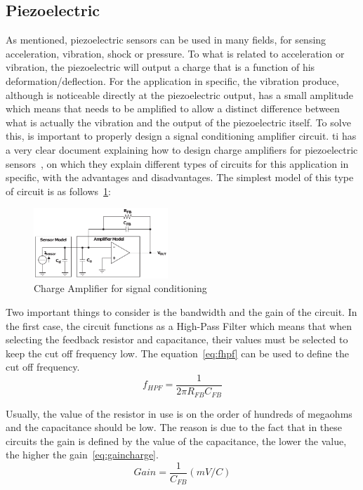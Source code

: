 \subsection{Piezoelectric}
As mentioned, piezoelectric sensors can be used in many fields, for sensing acceleration, vibration, shock or pressure. To what is related to acceleration or vibration, the piezoelectric will output a charge that is a function of his deformation/deflection. For the application in specific, the vibration produce, although is noticeable directly at the piezoelectric output, has a small amplitude which means that needs to be amplified to allow a distinct difference between what is actually the vibration and the output of the piezoelectric itself. To solve this, is important to properly design a signal conditioning amplifier circuit. \acrlong{ti} has a very clear document explaining how to design charge amplifiers for piezoelectric sensors~\cite{bartolomeSignalConditioningPiezoelectric2010}, on which they explain different types of circuits for this application in specific, with the advantages and disadvantages. The simplest model of this type of circuit is as follows~\ref{fig:ChargeAmpSimp}: 
\begin{figure}[]
    \centering
    \includegraphics[width=0.45\textwidth]{Chapters/4CHP/Figures/singleenddedchargeamp.pdf}
    \caption{Charge Amplifier for signal conditioning}
    \label{fig:ChargeAmpSimp}
\end{figure}

Two important things to consider is the bandwidth and the gain of the circuit. In the first case, the circuit functions as a High-Pass Filter which means that when selecting the feedback resistor and capacitance, their values must be selected to keep the cut off frequency low. The equation~\ref{eq:fhpf} can be used to define the cut off frequency.
\begin{equation}\label{eq:fhpf}
    f_{HPF} = \frac{1}{2\pi R_{FB}C_{FB}}
\end{equation}

Usually, the value of the resistor in use is on the order of hundreds of megaohms and the capacitance should be low. The reason is due to the fact that in these circuits the gain is defined by the value of the capacitance, the lower the value, the higher the gain~\ref{eq:gaincharge}.
\begin{equation}\label{eq:gaincharge}
    Gain = \frac{1}{C_{FB}} (mV/C)
\end{equation}

